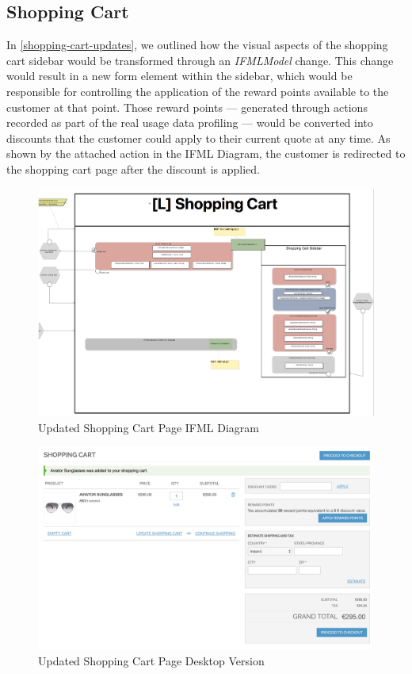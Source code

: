 \newpage
\subsection{Shopping Cart}

In \ref{shopping-cart-updates}, we outlined how the visual aspects of the shopping cart sidebar would be transformed through an \textit{IFMLModel} change. This change would result in a new form element within the sidebar, which would be responsible for controlling the application of the reward points available to the customer at that point. Those reward points --- generated through actions recorded as part of the real usage data profiling --- would be converted into discounts that the customer could apply to their current quote at any time. As shown by the attached action in the IFML Diagram, the customer is redirected to the shopping cart page after the discount is applied.

\vspace{0.5cm}
\begin{figure}[H]
  \centering
    \includegraphics[width=14cm]{images/diagrams/after/ifml-shopping-cart.png}
  \caption{Updated Shopping Cart Page IFML Diagram}
  \label{fig:ifml-after-shopping-cart}
\end{figure}

\begin{figure}[H]
  \centering
    \includegraphics[width=14cm]{images/diagrams/after/desktop-shopping-cart.png}
  \caption{Updated Shopping Cart Page Desktop Version}
  \label{fig:desktop-after-shopping-cart}
\end{figure}
\vspace{0.5cm}


